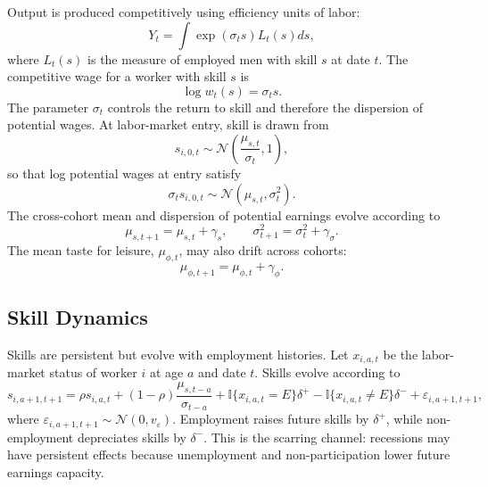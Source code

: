 \documentclass[12pt]{article}
\begin{document}
	Output is produced competitively using efficiency units of labor:
	\begin{equation}
		Y_t=\int \exp(\sigma_t s)L_t(s)ds,
	\end{equation}
	where $L_t(s)$ is the measure of employed men with skill $s$ at date $t$. The competitive wage for a worker with skill $s$ is
	\begin{equation}
		\log w_t(s)=\sigma_t s.
	\end{equation}
	The parameter $\sigma_t$ controls the return to skill and therefore the dispersion of potential wages. At labor-market entry, skill is drawn from
	\begin{equation}
		s_{i,0,t}\sim \mathcal{N}\left(\frac{\mu_{s,t}}{\sigma_t},1\right),
	\end{equation}
	so that log potential wages at entry satisfy
	\begin{equation}
		\sigma_t s_{i,0,t}\sim \mathcal{N}(\mu_{s,t},\sigma_t^2).
	\end{equation}
	The cross-cohort mean and dispersion of potential earnings evolve according to
	\begin{equation}
		\mu_{s,t+1}=\mu_{s,t}+\gamma_s,
		\qquad
		\sigma_{t+1}^2=\sigma_t^2+\gamma_{\sigma}.
	\end{equation}
	The mean taste for leisure, $\mu_{\phi,t}$, may also drift across cohorts:
	\begin{equation}
		\mu_{\phi,t+1}=\mu_{\phi,t}+\gamma_{\phi}.
	\end{equation}
	
	\subsection{Skill Dynamics}
	
	Skills are persistent but evolve with employment histories. Let $x_{i,a,t}$ be the labor-market status of worker $i$ at age $a$ and date $t$. Skills evolve according to
	\begin{equation}
		s_{i,a+1,t+1}=\rho s_{i,a,t}+(1-\rho)\frac{\mu_{s,t-a}}{\sigma_{t-a}}
		+\mathbb{I}\{x_{i,a,t}=E\}\delta^+
		-\mathbb{I}\{x_{i,a,t}\neq E\}\delta^-+\varepsilon_{i,a+1,t+1},
	\end{equation}
	where $\varepsilon_{i,a+1,t+1}\sim \mathcal{N}(0,v_{\varepsilon})$. Employment raises future skills by $\delta^+$, while non-employment depreciates skills by $\delta^-$. This is the scarring channel: recessions may have persistent effects because unemployment and non-participation lower future earnings capacity.
	
\end{document}
